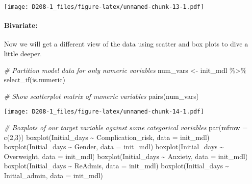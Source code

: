 \documentclass[
]{article}
\newenvironment{Shaded}{\begin{snugshade}}{\end{snugshade}}
\newcommand{\AttributeTok}[1]{\textcolor[rgb]{0.77,0.63,0.00}{#1}}
\newcommand{\CommentTok}[1]{\textcolor[rgb]{0.56,0.35,0.01}{\textit{#1}}}
\newcommand{\DecValTok}[1]{\textcolor[rgb]{0.00,0.00,0.81}{#1}}
\newcommand{\FunctionTok}[1]{\textcolor[rgb]{0.00,0.00,0.00}{#1}}
\newcommand{\NormalTok}[1]{#1}
\newcommand{\OtherTok}[1]{\textcolor[rgb]{0.56,0.35,0.01}{#1}}
\newcommand{\SpecialCharTok}[1]{\textcolor[rgb]{0.00,0.00,0.00}{#1}}
\begin{document}
\texttt{[image: D208-1\_files/figure-latex/unnamed-chunk-13-1.pdf]}

\hypertarget{bivariate}{%
\paragraph{Bivariate:}\label{bivariate}}

Now we will get a different view of the data using scatter and box plots
to dive a little deeper.

\begin{Shaded}
\begin{Highlighting}[]
\CommentTok{\# Partition model data for only numeric variables}
\NormalTok{num\_vars }\OtherTok{\textless{}{-}}\NormalTok{ init\_mdl }\SpecialCharTok{\%\textgreater{}\%} 
  \FunctionTok{select\_if}\NormalTok{(is.numeric)}

\CommentTok{\# Show scatterplot matrix of numeric variables}
\FunctionTok{pairs}\NormalTok{(num\_vars)}
\end{Highlighting}
\end{Shaded}

\texttt{[image: D208-1\_files/figure-latex/unnamed-chunk-14-1.pdf]}

\begin{Shaded}
\begin{Highlighting}[]
\CommentTok{\# Boxplots of our target variable against some categorical variables}
\FunctionTok{par}\NormalTok{(}\AttributeTok{mfrow =} \FunctionTok{c}\NormalTok{(}\DecValTok{2}\NormalTok{,}\DecValTok{3}\NormalTok{))}
\FunctionTok{boxplot}\NormalTok{(Initial\_days }\SpecialCharTok{\textasciitilde{}}\NormalTok{ Complication\_risk, }\AttributeTok{data =}\NormalTok{ init\_mdl)}
\FunctionTok{boxplot}\NormalTok{(Initial\_days }\SpecialCharTok{\textasciitilde{}}\NormalTok{ Gender, }\AttributeTok{data =}\NormalTok{ init\_mdl)}
\FunctionTok{boxplot}\NormalTok{(Initial\_days }\SpecialCharTok{\textasciitilde{}}\NormalTok{ Overweight, }\AttributeTok{data =}\NormalTok{ init\_mdl)}
\FunctionTok{boxplot}\NormalTok{(Initial\_days }\SpecialCharTok{\textasciitilde{}}\NormalTok{ Anxiety, }\AttributeTok{data =}\NormalTok{ init\_mdl)}
\FunctionTok{boxplot}\NormalTok{(Initial\_days }\SpecialCharTok{\textasciitilde{}}\NormalTok{ ReAdmis, }\AttributeTok{data =}\NormalTok{ init\_mdl)}
\FunctionTok{boxplot}\NormalTok{(Initial\_days }\SpecialCharTok{\textasciitilde{}}\NormalTok{ Initial\_admin, }\AttributeTok{data =}\NormalTok{ init\_mdl)}
\end{Highlighting}
\end{Shaded}
\end{document}
